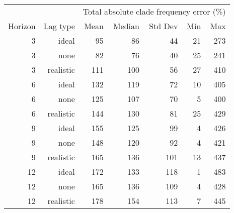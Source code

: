 
\begin{tabular*}{0.7\textwidth}{rrrrrrr}
\toprule
        &            & \multicolumn{5}{c}{Total absolute clade frequency error (\%)} \\
Horizon & Lag type & Mean & Median & Std Dev & Min & Max \\
\midrule

3 & ideal & 95 & 86 & 44 & 21 & 273 \\
3 & none & 82 & 76 & 40 & 25 & 241 \\
3 & realistic & 111 & 100 & 56 & 27 & 410 \\
6 & ideal & 132 & 119 & 72 & 10 & 405 \\
6 & none & 125 & 107 & 70 & 5 & 400 \\
6 & realistic & 144 & 130 & 81 & 25 & 429 \\
9 & ideal & 155 & 125 & 99 & 4 & 426 \\
9 & none & 148 & 120 & 92 & 4 & 421 \\
9 & realistic & 165 & 136 & 101 & 13 & 437 \\
12 & ideal & 172 & 133 & 118 & 1 & 483 \\
12 & none & 165 & 136 & 109 & 4 & 428 \\
12 & realistic & 178 & 154 & 113 & 7 & 445 \\

\bottomrule
\end{tabular*}

